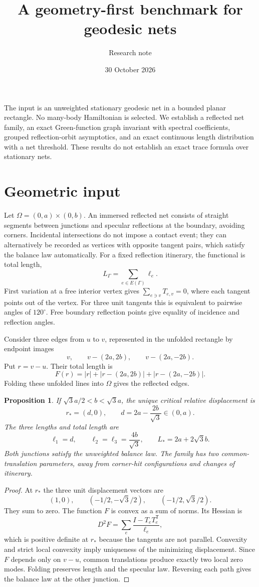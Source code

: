 \documentclass[11pt]{article}
\title{A geometry-first benchmark for geodesic nets}
\author{Research note}
\date{30 October 2026}
\newtheorem{proposition}{Proposition}
\begin{document}
\maketitle
The input is an unweighted stationary geodesic net in a bounded planar
rectangle. No many-body Hamiltonian is selected. We establish a reflected
net family, an exact Green-function graph invariant with spectral
coefficients, grouped reflection-orbit asymptotics, and an exact
continuous length distribution with a net threshold. These results
do not establish an exact trace formula over stationary nets.

\section{Geometric input}
Let $\Omega=(0,a)\times(0,b)$. An immersed reflected net consists of
straight segments between junctions and specular reflections at the
boundary, avoiding corners. Incidental intersections do not impose a
contact event; they can alternatively be recorded as vertices with
opposite tangent pairs, which satisfy the balance law automatically.
For a fixed reflection itinerary, the functional is total length,
\[
 L_\Gamma=\sum_{e\in E(\Gamma)}\ell_e.
\]
First variation at a free interior vertex gives
$\sum_{e\ni v}T_{e,v}=0$, where each tangent points out of the vertex.
For three unit tangents this is equivalent to pairwise angles of
$120^\circ$. Free boundary reflection points give equality of incidence
and reflection angles.

Consider three edges from $u$ to $v$, represented in the unfolded
rectangle by endpoint images
\[
 v,\qquad v-(2a,2b),\qquad v-(2a,-2b).
\]
Put $r=v-u$. Their total length is
\[
 F(r)=|r|+|r-(2a,2b)|+|r-(2a,-2b)|.
\]
Folding these unfolded lines into $\Omega$ gives the reflected edges.

\begin{proposition}
If $\sqrt3a/2<b<\sqrt3a$, the unique critical relative displacement
is
\[
 r_*=(d,0),\qquad d=2a-\frac{2b}{\sqrt3}\in(0,a).
\]
The three lengths and total length are
\[
 \ell_1=d,\qquad \ell_2=\ell_3=\frac{4b}{\sqrt3},
 \qquad L_*=2a+2\sqrt3b.
\]
Both junctions satisfy the unweighted balance law.
The family has two common-translation parameters, away from
corner-hit configurations and changes of itinerary.
\end{proposition}
\begin{proof}
At $r_*$ the three unit displacement vectors are
\[
 (1,0),\qquad(-1/2,-\sqrt3/2),\qquad(-1/2,\sqrt3/2).
\]
They sum to zero. The function $F$ is convex as a sum of norms.
Its Hessian is
\[
 D^2F=\sum_e\frac{I-T_eT_e^{\mathsf T}}{\ell_e},
\]
which is positive definite at $r_*$ because the tangents are not
parallel. Convexity and strict local convexity imply uniqueness of the
minimizing displacement. Since $F$ depends only on $v-u$, common
translations produce exactly two local zero modes. Folding preserves
length and the specular law. Reversing each path gives the balance law
at the other junction.
\end{proof}
\end{document}

